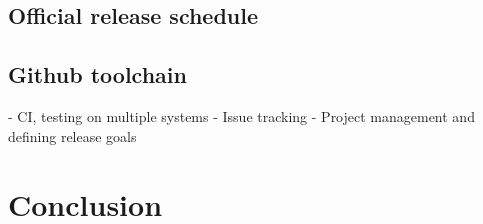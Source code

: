 \documentclass[]{spie}  %
\begin{document}
 
\subsection{Official release schedule}
\label{ssec:dev_releases}



\subsection{Github toolchain}
\label{ssec:dev_testing}
	- CI, testing on multiple systems
	- Issue tracking
	- Project management and defining release goals

\section{Conclusion}
\label{sec:conclusion}






\appendix    %

\acknowledgments %

\end{document}
